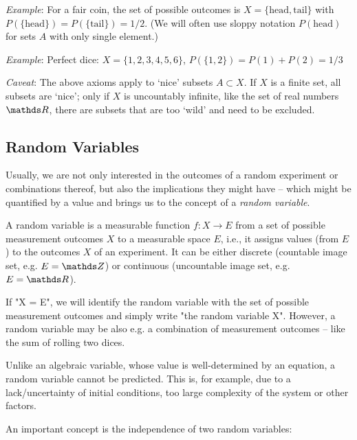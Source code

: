 \documentclass{notebook}
\newcommand{\Caveat}{\textit{Caveat}}
\newcommand{\Example}{\textit{Example}}
\begin{document}
\Example: For a fair coin, the set of possible outcomes is $X=\{\text{head},\text{tail}\}$ with $P(\{\text{head}\})=P(\{\text{tail}\})=1/2$.  (We will often use sloppy notation $P(\text{head})$ for sets $A$ with only single element.)

\Example: Perfect dice: $X=\{1,2,3,4,5,6\}$, $P(\{1,2\})=P(1)+P(2)=1/3$

\Caveat: The above axioms apply to `nice' subsets $A \subset X$. If $X$ is a finite set, all subsets are `nice'; only if $X$ is uncountably infinite, like the set of real numbers $\R$, there are subsets that are too `wild' and need to be excluded.


\subsection*{Random Variables}

Usually, we are not only interested in the outcomes of a random experiment or combinations thereof, but also the implications they might have – which might be quantified by a value and brings us to the concept of a \textit{random variable}.

\begin{theorem}
	A random variable is a measurable function $f:X \to E$ from a set of possible measurement outcomes $X$ to a measurable space $E$, i.e., it assigns values (from $E$) to the outcomes $X$ of an experiment. It can be either discrete (countable image set, e.g. $E = \Z$) or continuous (uncountable image set, e.g. $E = \R$).

\end{theorem}

If "X = E", we will identify the random variable with the set of possible measurement outcomes and simply write "the random variable X". However, a random variable may be also e.g. a combination of measurement outcomes – like the sum of rolling two dices.

Unlike an algebraic variable, whose value is well-determined by an equation, a random variable cannot be predicted. This is, for example, due to a lack/uncertainty of initial conditions, too large complexity of the system or other factors. 

An important concept is the independence of two random variables:
\end{document}
